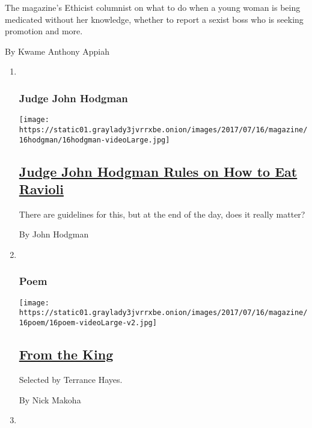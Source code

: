 \begin{enumerate}
  The magazine's Ethicist columnist on what to do when a young woman is
  being medicated without her knowledge, whether to report a sexist boss
  who is seeking promotion and more.

  By Kwame Anthony Appiah
\end{enumerate}

\begin{enumerate}
\def\labelenumi{\arabic{enumi}.}
\item ~
  \hypertarget{judge-john-hodgman}{%
  \subsubsection{Judge John Hodgman}\label{judge-john-hodgman}}

  \texttt{[image: https://static01.graylady3jvrrxbe.onion/images/2017/07/16/magazine/16hodgman/16hodgman-videoLarge.jpg]}

  \hypertarget{judge-john-hodgman-rules-on-how-to-eat-ravioli}{%
  \subsection{\texorpdfstring{\href{/2017/07/14/magazine/judge-john-hodgman-rules-on-how-to-eat-ravioli.html}{Judge
  John Hodgman Rules on How to Eat
  Ravioli}}{Judge John Hodgman Rules on How to Eat Ravioli}}\label{judge-john-hodgman-rules-on-how-to-eat-ravioli}}

  There are guidelines for this, but at the end of the day, does it
  really matter?

  By John Hodgman
\item ~
  \hypertarget{poem}{%
  \subsubsection{Poem}\label{poem}}

  \texttt{[image: https://static01.graylady3jvrrxbe.onion/images/2017/07/16/magazine/16poem/16poem-videoLarge-v2.jpg]}

  \hypertarget{from-the-king}{%
  \subsection{\texorpdfstring{\href{/2017/07/14/magazine/from-the-king.html}{From
  the King}}{From the King}}\label{from-the-king}}

  Selected by Terrance Hayes.

  By Nick Makoha
\item ~
  \hypertarget{tip}{%
}
\end{enumerate}
